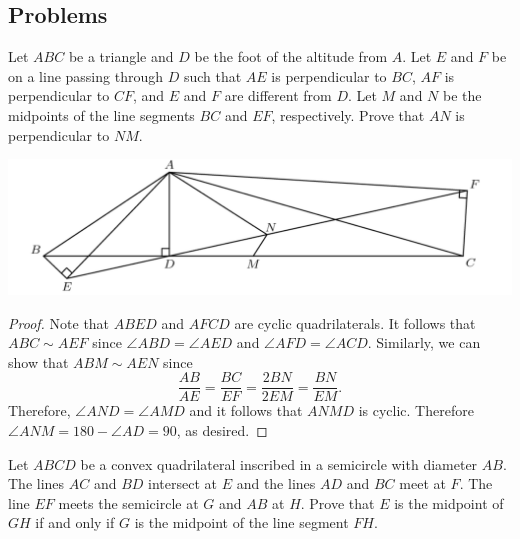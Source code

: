 \documentclass[12pt]{scrartcl}
\newcommand{\<}{\langle}
\renewcommand{\>}{\rangle}
\begin{document}
\subsection{Problems}
\begin{Prob} Let $ABC$ be a triangle and $D$ be the foot of the altitude from $A$. Let $E$ and $F$ be on a line passing through $D$ such that $AE$ is perpendicular to $BC$, $AF$ is perpendicular to $CF$, and $E$ and $F$ are different from $D$.  Let $M$ and $N$ be the midpoints of the line segments $BC$ and $EF$, respectively.  Prove that $AN$ is perpendicular to $NM$.
\end{Prob}
\begin{center}
\includegraphics[scale=0.6]{graphics/p1-1.png}
\end{center}
\begin{proof}
Note that $ABED$ and $AFCD$ are cyclic quadrilaterals.  It follows that $ABC \sim AEF$ since $\angle ABD = \angle AED$ and $\angle AFD = \angle ACD$.  Similarly, we can show that $ABM \sim AEN$ since 
$$\frac{AB}{AE} = \frac{BC}{EF} = \frac{2BN}{2EM} = \frac{BN}{EM}.$$
Therefore, $\angle AND = \angle AMD$ and it follows that $ANMD$ is cyclic.  Therefore $\angle ANM = 180-\angle AD = 90$, as desired.
\end{proof}
\begin{Prob} Let $ABCD$ be a convex quadrilateral inscribed in a semicircle with diameter $AB$.  The lines $AC$ and $BD$ intersect at $E$ and the lines $AD$ and $BC$ meet at $F$.  The line $EF$ meets the semicircle at $G$ and $AB$ at $H$.  Prove that $E$ is the midpoint of $GH$ if and only if $G$ is the midpoint of the line segment $FH$.
\end{Prob}
\end{document}
